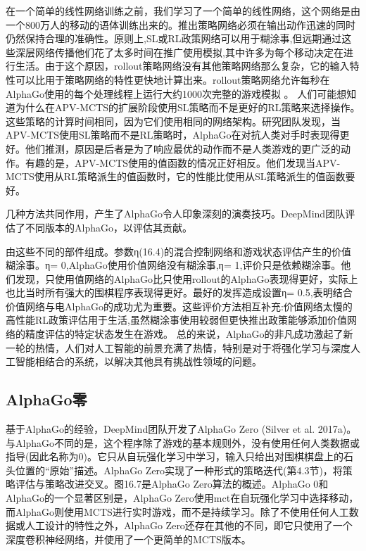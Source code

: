 在一个简单的线性网络训练之前，我们学习了一个简单的线性网络，这个网络是由一个800万人的移动的语体训练出来的。推出策略网络必须在输出动作迅速的同时仍然保持合理的准确性。原则上,SL或RL政策网络可以用于糊涂事,但远期通过这些深层网络传播他们花了太多时间在推广使用模拟,其中许多为每个移动决定在进行生活。由于这个原因，rollout策略网络没有其他策略网络那么复杂，它的输入特性可以比用于策略网络的特性更快地计算出来。rollout策略网络允许每秒在AlphaGo使用的每个处理线程上运行大约1000次完整的游戏模拟
。
人们可能想知道为什么在APV-MCTS的扩展阶段使用SL策略而不是更好的RL策略来选择操作。这些策略的计算时间相同，因为它们使用相同的网络架构。研究团队发现，当APV-MCTS使用SL策略而不是RL策略时，AlphaGo在对抗人类对手时表现得更好。他们推测，原因是后者是为了响应最优的动作而不是人类游戏的更广泛的动作。有趣的是，APV-MCTS使用的值函数的情况正好相反。他们发现当APV-MCTS使用从RL策略派生的值函数时，它的性能比使用从SL策略派生的值函数要好。

几种方法共同作用，产生了AlphaGo令人印象深刻的演奏技巧。DeepMind团队评估了不同版本的AlphaGo，以评估其贡献。

由这些不同的部件组成。参数η(16.4)的混合控制网络和游戏状态评估产生的价值糊涂事。η= 0,AlphaGo使用价值网络没有糊涂事,η= 1,评价只是依赖糊涂事。他们发现，只使用值网络的AlphaGo比只使用rollout的AlphaGo表现得更好，实际上也比当时所有强大的围棋程序表现得更好。最好的发挥造成设置η= 0.5,表明结合价值网络与电AlphaGo的成功尤为重要。这些评价方法相互补充:价值网络太慢的高性能RL政策评估用于生活,虽然糊涂事使用较弱但更快推出政策能够添加价值网络的精度评估的特定状态发生在游戏。
总的来说，AlphaGo的非凡成功激起了新一轮的热情，人们对人工智能的前景充满了热情，特别是对于将强化学习与深度人工智能相结合的系统，以解决其他具有挑战性领域的问题。


\subsection{AlphaGo零}

基于AlphaGo的经验，DeepMind团队开发了AlphaGo Zero (Silver et al. 2017a)。与AlphaGo不同的是，这个程序除了游戏的基本规则外，没有使用任何人类数据或指导(因此名称为0)。它只从自玩强化学习中学习，输入只给出对围棋棋盘上的石头位置的“原始”描述。AlphaGo Zero实现了一种形式的策略迭代(第4.3节)，将策略评估与策略改进交叉。图16.7是AlphaGo Zero算法的概述。AlphaGo 0和AlphaGo的一个显著区别是，AlphaGo Zero使用mct在自玩强化学习中选择移动，而AlphaGo则使用MCTS进行实时游戏，而不是持续学习。除了不使用任何人工数据或人工设计的特性之外，AlphaGo Zero还存在其他的不同，即它只使用了一个深度卷积神经网络，并使用了一个更简单的MCTS版本。

